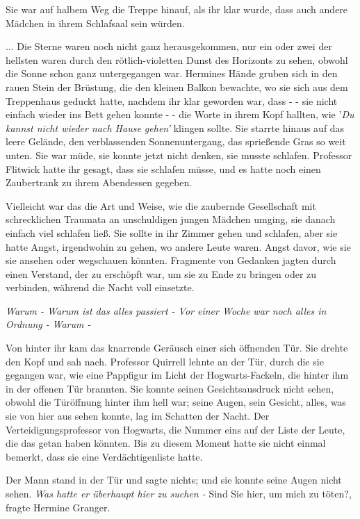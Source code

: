 Sie war auf halbem Weg die Treppe hinauf, als ihr klar wurde, dass auch andere
Mädchen in ihrem Schlafsaal sein würden.


... Die Sterne waren noch nicht ganz herausgekommen, nur ein oder zwei der
hellsten waren durch den rötlich-violetten Dunst des Horizonts zu sehen, obwohl
die Sonne schon ganz untergegangen war. Hermines Hände gruben sich in den rauen
Stein der Brüstung, die den kleinen Balkon bewachte, wo sie sich aus dem
Treppenhaus geduckt hatte, nachdem ihr klar geworden war, dass - - sie nicht
einfach wieder ins Bett gehen konnte - - die Worte in ihrem Kopf hallten, wie
'\emph{Du kannst nicht wieder nach Hause gehen' }klingen sollte. Sie starrte
hinaus auf das leere Gelände, den verblassenden Sonnenuntergang, das sprießende
Gras so weit unten. Sie war müde, sie konnte jetzt nicht denken, sie musste
schlafen. Professor Flitwick hatte ihr gesagt, dass sie schlafen müsse, und es
hatte noch einen Zaubertrank zu ihrem Abendessen gegeben.

Vielleicht war das die Art und Weise, wie die zaubernde Gesellschaft mit
schrecklichen Traumata an unschuldigen jungen Mädchen umging, sie danach einfach
viel schlafen ließ. Sie sollte in ihr Zimmer gehen und schlafen, aber sie hatte
Angst, irgendwohin zu gehen, wo andere Leute waren. Angst davor, wie sie sie
ansehen oder wegschauen könnten. Fragmente von Gedanken jagten durch einen
Verstand, der zu erschöpft war, um sie zu Ende zu bringen oder zu verbinden,
während die Nacht voll einsetzte.

\emph{Warum - Warum ist das alles passiert - Vor einer Woche war noch alles in
Ordnung - }\emph{Warum - }

Von hinter ihr kam das knarrende Geräusch einer sich öffnenden Tür. Sie drehte
den Kopf und sah nach. Professor Quirrell lehnte an der Tür, durch die sie
gegangen war, wie eine Pappfigur im Licht der Hogwarts-Fackeln, die hinter ihm
in der offenen Tür brannten. Sie konnte seinen Gesichtsausdruck nicht sehen,
obwohl die Türöffnung hinter ihm hell war; seine Augen, sein Gesicht, alles, was
sie von hier aus sehen konnte, lag im Schatten der Nacht. Der
Verteidigungsprofessor von Hogwarts, die Nummer eins auf der Liste der Leute,
die das getan haben könnten. Bis zu diesem Moment hatte sie nicht einmal
bemerkt, dass sie eine Verdächtigenliste hatte.

Der Mann stand in der Tür und sagte nichts; und sie konnte seine Augen nicht
sehen. \emph{Was hatte er überhaupt hier zu suchen -} \glqq Sind Sie hier, um
mich zu töten?\grqq{}, fragte Hermine Granger.

